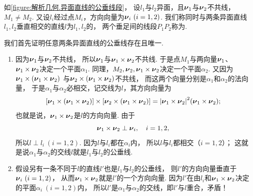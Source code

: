 如\cref{figure:解析几何.异面直线的公垂线段}，
设\(l_1\)与\(l_2\)异面，且\(\boldsymbol{\nu}_1\)与\(\boldsymbol{\nu}_2\)不共线，\(M_1 \neq M_2\).
又设\(l_i\)经过点\(M_i\)，方向向量为\(\boldsymbol{\nu}_i\ (i=1,2)\).
我们称同时与两条异面直线\(l_1,l_2\)垂直相交的直线\(l\)为\(l_1,l_2\)的，
两个垂足间的线段\(P_1 P_2\)称为.

我们首先证明任意两条异面直线的公垂线存在且唯一.
\begin{enumerate}
	\item 因为\(\boldsymbol{\nu}_1\)与\(\boldsymbol{\nu}_2\)不共线，
	所以\(\boldsymbol{\nu}_1\)与\(\boldsymbol{\nu}_1\times\boldsymbol{\nu}_2\)不共线.
	于是点\(M_1\)与两向量\(\boldsymbol{\nu}_1\)、\(\boldsymbol{\nu}_1\times\boldsymbol{\nu}_2\)决定一个平面\(\alpha_1\).
	同理，\(M_2,\boldsymbol{\nu}_2,\boldsymbol{\nu}_1\times\boldsymbol{\nu}_2\)决定一个平面\(\alpha_2\).
	又因为\(\boldsymbol{\nu}_1\times(\boldsymbol{\nu}_1\times\boldsymbol{\nu}_2)\)
	与\(\boldsymbol{\nu}_2\times(\boldsymbol{\nu}_1\times\boldsymbol{\nu}_2)\)不共线，
	而这两个向量分别是\(\alpha_1\)和\(\alpha_2\)的法向量，
	于是\(\alpha_1\)与\(\alpha_2\)必相交，记交线为\(l\)，其方向向量为\begin{equation*}
		[\boldsymbol{\nu}_1\times(\boldsymbol{\nu}_1\times\boldsymbol{\nu}_2)]\times[\boldsymbol{\nu}_2\times(\boldsymbol{\nu}_1\times\boldsymbol{\nu}_2)]
		= \abs{\boldsymbol{\nu}_1\times\boldsymbol{\nu}_2}^2
			(\boldsymbol{\nu}_1\times\boldsymbol{\nu}_2);
	\end{equation*}
	也就是说，\(\boldsymbol{\nu}_1\times\boldsymbol{\nu}_2\)是\(l\)的方向向量.
	由于\begin{equation*}
		\boldsymbol{\nu}_1\times\boldsymbol{\nu}_2 \perp \boldsymbol{\nu}_i,
		\quad i=1,2,
	\end{equation*}
	所以\(l \perp l_i\ (i=1,2)\).
	因为\(l\)与\(l_i\)都在\(\alpha_i\)内，
	所以\(l\)与\(l_i\)都相交（\(i=1,2\)）；
	这就是说\(\alpha_1\)与\(\alpha_2\)的交线\(l\)就是\(l_1\)与\(l_2\)的公垂线.

	\item 假设另有一条不同于\(l\)的直线\(l'\)也是\(l_1\)与\(l_2\)的公垂线，
	则\(l'\)的方向向量垂直于\(\boldsymbol{\nu}_i\ (i=1,2)\)，
	从而\(\boldsymbol{\nu}_1\times\boldsymbol{\nu}_2\)就是\(l'\)的一个方向向量.
	因为\(l'\)在由\(l_i\)和\(\boldsymbol{\nu}_1\times\boldsymbol{\nu}_2\)决定的平面\(\alpha_i\ (i=1,2)\)内，
	所以\(l'\)是\(\alpha_1\)与\(\alpha_2\)的交线，即\(l'\)与\(l\)重合，矛盾！
\end{enumerate}


